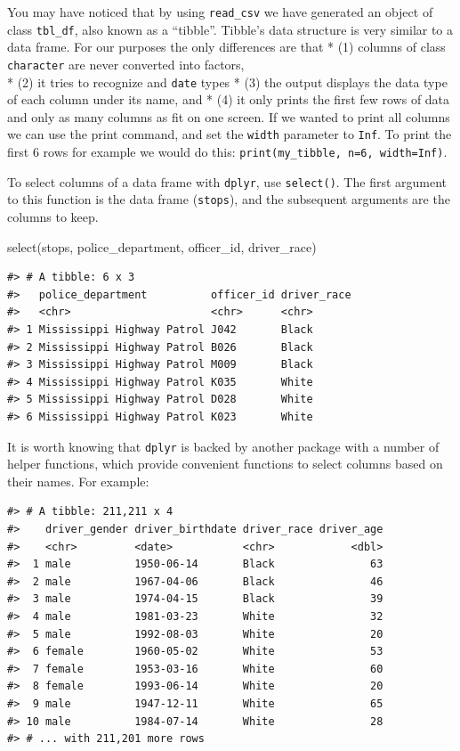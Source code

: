 \documentclass[
]{book}
\newenvironment{Shaded}{\begin{snugshade}}{\end{snugshade}}
\newcommand{\FunctionTok}[1]{\textcolor[rgb]{0.00,0.00,0.00}{#1}}
\newcommand{\NormalTok}[1]{#1}
\begin{document}
You may have noticed that by using \texttt{read\_csv} we have generated an object
of class \texttt{tbl\_df}, also known as a ``tibble''. Tibble's data
structure is very similar to a data frame. For our purposes the only differences
are that
* (1) columns of class \texttt{character} are never converted into factors,\\
* (2) it tries to recognize and \texttt{date} types
* (3) the output displays the data type of each column under its name, and
* (4) it only prints the first few rows of data and only as many columns as fit on one screen. If we wanted to print all columns we can use the print command, and set the \texttt{width} parameter to \texttt{Inf}. To print the first 6 rows for example we would do this: \texttt{print(my\_tibble,\ n=6,\ width=Inf)}.

To select columns of a
data frame with \texttt{dplyr}, use \texttt{select()}. The first argument to this function is the data
frame (\texttt{stops}), and the subsequent arguments are the columns to keep.

\begin{Shaded}
\begin{Highlighting}[]
\FunctionTok{select}\NormalTok{(stops, police\_department, officer\_id, driver\_race)}
\end{Highlighting}
\end{Shaded}

\begin{verbatim}
#> # A tibble: 6 x 3
#>   police_department          officer_id driver_race
#>   <chr>                      <chr>      <chr>      
#> 1 Mississippi Highway Patrol J042       Black      
#> 2 Mississippi Highway Patrol B026       Black      
#> 3 Mississippi Highway Patrol M009       Black      
#> 4 Mississippi Highway Patrol K035       White      
#> 5 Mississippi Highway Patrol D028       White      
#> 6 Mississippi Highway Patrol K023       White
\end{verbatim}

It is worth knowing that \texttt{dplyr} is backed by another package with a number of helper functions, which provide convenient functions to select columns based on their names. For example:

\begin{verbatim}
#> # A tibble: 211,211 x 4
#>    driver_gender driver_birthdate driver_race driver_age
#>    <chr>         <date>           <chr>            <dbl>
#>  1 male          1950-06-14       Black               63
#>  2 male          1967-04-06       Black               46
#>  3 male          1974-04-15       Black               39
#>  4 male          1981-03-23       White               32
#>  5 male          1992-08-03       White               20
#>  6 female        1960-05-02       White               53
#>  7 female        1953-03-16       White               60
#>  8 female        1993-06-14       White               20
#>  9 male          1947-12-11       White               65
#> 10 male          1984-07-14       White               28
#> # ... with 211,201 more rows
\end{verbatim}
\end{document}
